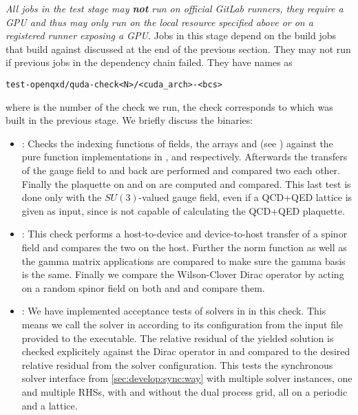 \emph{All jobs in the test stage may \textbf{not} run on official GitLab runners, they require a GPU and thus may only run on the local resource specified above or on a registered runner exposing a GPU.}
Jobs in this stage depend on the build jobs that build \openqxd against \quda discussed at the end of the previous section.
They may not run if previous jobs in the dependency chain failed.
They have names as
\begin{verbatim}
test-openqxd/quda-check<N>/<cuda_arch>-<bcs>
\end{verbatim}
where  is the number of the check we run, \ie the check corresponds to  which was built in the previous stage.
We briefly discuss the binaries:
\begin{itemize}
  \item {}: Checks the indexing functions of fields, \ie the arrays  and  (see ) against the pure function implementations in \quda,  and  respectively. Afterwards the transfers of the gauge field to \quda and back are performed and compared two each other. Finally the plaquette on \quda and on \openqxd are computed and compared. This last test is done only with the $SU(3)$-valued gauge field, even if a QCD+QED lattice is given as input, since \quda is not capable of calculating the QCD+QED plaquette.
  \item {}: This check performs a host-to-device and device-to-host transfer of a spinor field and compares the two on the host. Further the norm function as well as the gamma matrix applications are compared to make sure the gamma basis is the same. Finally we compare the Wilson-Clover Dirac operator by acting on a random spinor field on both \openqxd and \quda and compare them.
  \item {}: We have implemented acceptance tests of solvers in \quda in this check. This means we call the solver in \quda according to its configuration from the input file provided to the executable. The relative residual of the yielded solution is checked explicitely against the Dirac operator in \openqxd and compared to the desired relative residual from the solver configuration. This tests the synchronous solver interface from \cref{sec:develop:sync:way} with multiple solver instances, one and multiple RHSs, with and without the dual process grid, all on a periodic and a \Cstar lattice.

\end{itemize}

